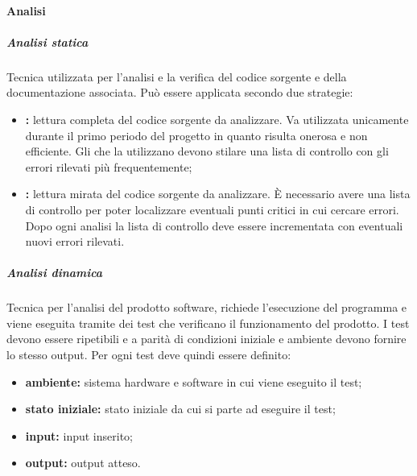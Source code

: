             \paragraph{Analisi}
                \subparagraph{Analisi statica}
                Tecnica utilizzata per l'analisi e la verifica del codice sorgente e della documentazione associata. Può essere applicata secondo due strategie:
                \begin{itemize}
                    \item \textbf{:} lettura completa del codice sorgente da analizzare. Va utilizzata unicamente durante il primo periodo del progetto in quanto risulta onerosa e non efficiente. Gli \analisti{} che la utilizzano devono stilare una lista di controllo con gli errori rilevati più frequentemente;
                    \item \textbf{:} lettura mirata del codice sorgente da analizzare. È necessario avere una lista di controllo per poter localizzare eventuali punti critici in cui cercare errori. Dopo ogni analisi la lista di controllo deve essere incrementata con eventuali nuovi errori rilevati.
                \end{itemize}
                \subparagraph{Analisi dinamica}
                Tecnica per l'analisi del prodotto software, richiede l'esecuzione del programma e viene eseguita tramite dei test che verificano il funzionamento del prodotto. I test devono essere ripetibili e a parità di condizioni iniziale e ambiente devono fornire lo stesso output. Per ogni test deve quindi essere definito:
                \begin{itemize}
                    \item \textbf{ambiente:} sistema hardware e software in cui viene eseguito il test;
                    \item \textbf{stato iniziale:} stato iniziale da cui si parte ad eseguire il test;
                    \item \textbf{input:} input inserito;
                    \item \textbf{output:} output atteso.
                \end{itemize}
            
